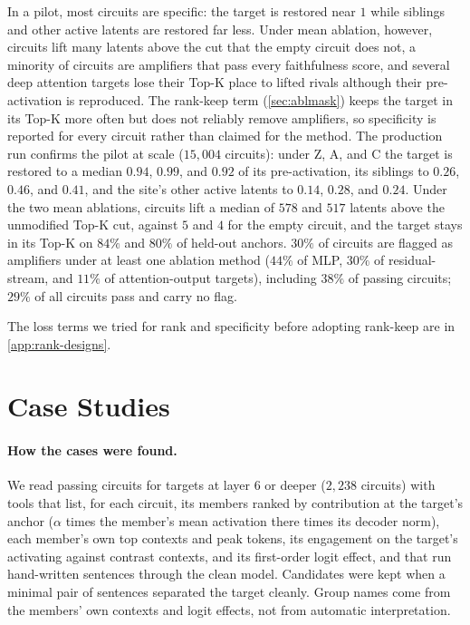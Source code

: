 \documentclass[10pt]{article}
\begin{document}
In a pilot, most circuits are specific: the target is restored near $1$ while siblings and other active latents are restored far less.
Under mean ablation, however, circuits lift many latents above the cut that the empty circuit does not, a minority of circuits are amplifiers that pass every faithfulness score, and several deep attention targets lose their Top-K place to lifted rivals although their pre-activation is reproduced.
The rank-keep term (\cref{sec:ablmask}) keeps the target in its Top-K more often but does not reliably remove amplifiers, so specificity is reported for every circuit rather than claimed for the method.
The production run confirms the pilot at scale ($15{,}004$ circuits): under Z, A, and C the target is restored to a median $0.94$, $0.99$, and $0.92$ of its pre-activation, its siblings to $0.26$, $0.46$, and $0.41$, and the site's other active latents to $0.14$, $0.28$, and $0.24$.
Under the two mean ablations, circuits lift a median of $578$ and $517$ latents above the unmodified Top-K cut, against $5$ and $4$ for the empty circuit, and the target stays in its Top-K on $84\%$ and $80\%$ of held-out anchors.
$30\%$ of circuits are flagged as amplifiers under at least one ablation method ($44\%$ of MLP, $30\%$ of residual-stream, and $11\%$ of attention-output targets), including $38\%$ of passing circuits; $29\%$ of all circuits pass and carry no flag.

The loss terms we tried for rank and specificity before adopting rank-keep are in \cref{app:rank-designs}.

\section{Case Studies}
\label{app:case-studies}

\paragraph{How the cases were found.}
We read passing circuits for targets at layer 6 or deeper ($2{,}238$ circuits) with tools that list, for each circuit, its members ranked by contribution at the target's anchor ($\alpha$ times the member's mean activation there times its decoder norm), each member's own top contexts and peak tokens, its engagement on the target's activating against contrast contexts, and its first-order logit effect, and that run hand-written sentences through the clean model.
Candidates were kept when a minimal pair of sentences separated the target cleanly.
Group names come from the members' own contexts and logit effects, not from automatic interpretation.
\end{document}
